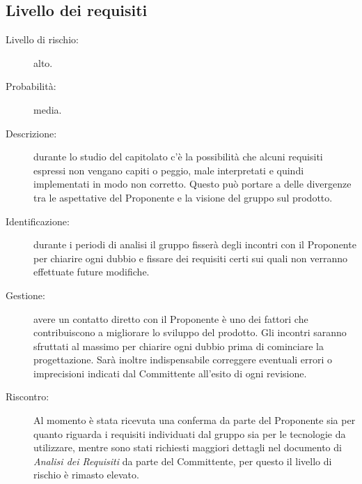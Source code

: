 \subsection{Livello dei requisiti}
\begin{description}
	\item[Livello di rischio:] alto.
	\item[Probabilità:] media.
	\item[Descrizione:] durante lo studio del capitolato c'è la possibilità che alcuni requisiti espressi non vengano capiti o peggio, male interpretati e quindi implementati in modo non corretto. Questo può portare a delle divergenze tra le aspettative del Proponente e la visione del gruppo sul prodotto. 
	\item[Identificazione:] durante i periodi di analisi il gruppo fisserà degli incontri con il Proponente per chiarire ogni dubbio e fissare dei requisiti certi sui quali non verranno effettuate future modifiche.
	\item[Gestione:] avere un contatto diretto con il Proponente è uno dei fattori che contribuiscono a migliorare lo sviluppo del prodotto. Gli incontri saranno sfruttati al massimo per chiarire ogni dubbio prima di cominciare la progettazione. Sarà inoltre indispensabile correggere eventuali errori o imprecisioni indicati dal Committente all'esito di ogni revisione.
	\item[Riscontro:] Al momento è stata ricevuta una conferma da parte del Proponente sia per quanto riguarda i requisiti individuati dal gruppo sia per le tecnologie da utilizzare, mentre sono stati richiesti maggiori dettagli nel documento di \textit{Analisi dei Requisiti} da parte del Committente, per questo il livello di rischio è rimasto elevato.
\end{description}

